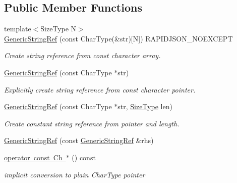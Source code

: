 \subsection*{Public Member Functions}
\begin{DoxyCompactItemize}
\item 
{\footnotesize template$<$Size\+Type N$>$ }\\\mbox{\hyperlink{structrapidjson_1_1_generic_string_ref_acd4d5ebac2b610ce647356aa52998002}{Generic\+String\+Ref}} (const Char\+Type(\&str)\mbox{[}N\mbox{]}) R\+A\+P\+I\+D\+J\+S\+O\+N\+\_\+\+N\+O\+E\+X\+C\+E\+PT
\begin{DoxyCompactList}\small\item\em Create string reference from {\ttfamily const} character array. \end{DoxyCompactList}\item 
\mbox{\hyperlink{structrapidjson_1_1_generic_string_ref_a29cf407c6aa2313f13dff78d6ce02687}{Generic\+String\+Ref}} (const Char\+Type $\ast$str)
\begin{DoxyCompactList}\small\item\em Explicitly create string reference from {\ttfamily const} character pointer. \end{DoxyCompactList}\item 
\mbox{\hyperlink{structrapidjson_1_1_generic_string_ref_ad9eb120a58cee500ff3bd5706779c4e4}{Generic\+String\+Ref}} (const Char\+Type $\ast$str, \mbox{\hyperlink{namespacerapidjson_a44eb33eaa523e36d466b1ced64b85c84}{Size\+Type}} len)
\begin{DoxyCompactList}\small\item\em Create constant string reference from pointer and length. \end{DoxyCompactList}\item 
\mbox{\hyperlink{structrapidjson_1_1_generic_string_ref_a45345164abed97ea24603d2020b33448}{Generic\+String\+Ref}} (const \mbox{\hyperlink{structrapidjson_1_1_generic_string_ref}{Generic\+String\+Ref}} \&rhs)
\item 
\mbox{\hyperlink{structrapidjson_1_1_generic_string_ref_a86d30bb594a41619a7a5ba6c8dcce2bd}{operator const Ch $\ast$}} () const
\begin{DoxyCompactList}\small\item\em implicit conversion to plain Char\+Type pointer \end{DoxyCompactList}\end{DoxyCompactItemize}
